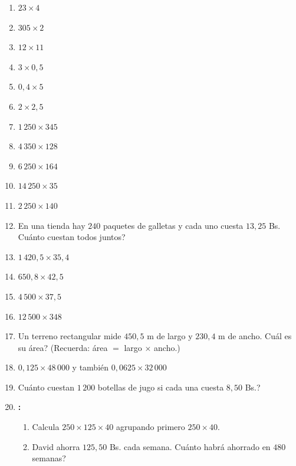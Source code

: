\documentclass[12pt, letterpaper]{article}
\begin{document}
\begin{enumerate}[leftmargin=*, start=45]
  \item \facil{} $23 \times 4$

  \item \facil{} $305 \times 2$

  \item \facil{} $12 \times 11$

  \item \facil{} $3 \times 0{,}5$

  \item \facil{} $0{,}4 \times 5$

  \item \facil{} $2 \times 2{,}5$

  \item \medio{} $1\,250 \times 345$

  \item \medio{} $4\,350 \times 128$

  \item \medio{} $6\,250 \times 164$

  \item \medio{} $14\,250 \times 35$

  \item \medio{} $2\,250 \times 140$

  \item \medio{} En una tienda hay $240$ paquetes de galletas y cada uno cuesta $13{,}25$ Bs. \textquestiondown Cuánto cuestan todos juntos?

  \item \medio{} $1\,420{,}5 \times 35{,}4$

  \item \medio{} $650{,}8 \times 42{,}5$

  \item \medio{} $4\,500 \times 37{,}5$

  \item \dificil{} $12\,500 \times 348$

  \item \dificil{} Un terreno rectangular mide $450{,}5$ m de largo y $230{,}4$ m de ancho. \textquestiondown Cuál es su área? (Recuerda: área $=$ largo $\times$ ancho.)

  \item \dificil{} $0{,}125 \times 48\,000$ y también $0{,}0625 \times 32\,000$

  \item \dificil{} \textquestiondown Cuánto cuestan $1\,200$ botellas de jugo si cada una cuesta $8{,}50$ Bs.?
  \item \dificil{} \textbf{:}
        \begin{enumerate}[label=\alph*)]
          \item Calcula $250 \times 125 \times 40$ agrupando primero $250 \times 40$.
          \item David ahorra $125{,}50$ Bs. cada semana. \textquestiondown Cuánto habrá ahorrado en $480$ semanas?
        \end{enumerate}
\end{enumerate}
\end{document}

